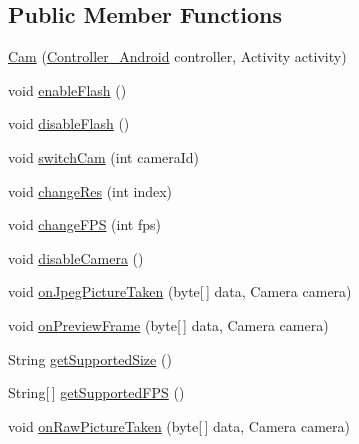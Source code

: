 \subsection*{Public Member Functions}
\begin{DoxyCompactItemize}
\item 
\hyperlink{classswp_1_1tuilmenau_1_1carduinodroid_1_1controller_1_1_cam_a8d39103ae69c076073e36459435c3e6b}{Cam} (\hyperlink{classswp_1_1tuilmenau_1_1carduinodroid_1_1controller_1_1_controller___android}{Controller\+\_\+\+Android} controller, Activity activity)
\item 
void \hyperlink{classswp_1_1tuilmenau_1_1carduinodroid_1_1controller_1_1_cam_a52096c4e16807a5338877c2249bfead5}{enable\+Flash} ()
\item 
void \hyperlink{classswp_1_1tuilmenau_1_1carduinodroid_1_1controller_1_1_cam_a043a28dda760fb66a89c670d97e70e60}{disable\+Flash} ()
\item 
void \hyperlink{classswp_1_1tuilmenau_1_1carduinodroid_1_1controller_1_1_cam_a7550a372448fb220d685acee511882f3}{switch\+Cam} (int camera\+Id)
\item 
void \hyperlink{classswp_1_1tuilmenau_1_1carduinodroid_1_1controller_1_1_cam_a14be40feed14460ce45a254bb9d5573d}{change\+Res} (int index)
\item 
void \hyperlink{classswp_1_1tuilmenau_1_1carduinodroid_1_1controller_1_1_cam_a935021c173d3d0a4e9d9cf1f0fc9253a}{change\+F\+P\+S} (int fps)
\item 
void \hyperlink{classswp_1_1tuilmenau_1_1carduinodroid_1_1controller_1_1_cam_a31a9a63c265425f1917dea93e722e49f}{disable\+Camera} ()
\item 
void \hyperlink{classswp_1_1tuilmenau_1_1carduinodroid_1_1controller_1_1_cam_a9d02cf28701a301ae81da9d826b6c6d6}{on\+Jpeg\+Picture\+Taken} (byte\mbox{[}$\,$\mbox{]} data, Camera camera)
\item 
void \hyperlink{classswp_1_1tuilmenau_1_1carduinodroid_1_1controller_1_1_cam_a36c84a09cf6164b9e80426a61a5ec860}{on\+Preview\+Frame} (byte\mbox{[}$\,$\mbox{]} data, Camera camera)
\item 
String \hyperlink{classswp_1_1tuilmenau_1_1carduinodroid_1_1controller_1_1_cam_aaea0b22ca98286ebc752799baf919457}{get\+Supported\+Size} ()
\item 
String\mbox{[}$\,$\mbox{]} \hyperlink{classswp_1_1tuilmenau_1_1carduinodroid_1_1controller_1_1_cam_ab293c9b431dc51ea0e16584720375473}{get\+Supported\+F\+P\+S} ()
\item 
void \hyperlink{classswp_1_1tuilmenau_1_1carduinodroid_1_1controller_1_1_cam_a356797b49cf972aa95148c88702cf81a}{on\+Raw\+Picture\+Taken} (byte\mbox{[}$\,$\mbox{]} data, Camera camera)

\end{DoxyCompactItemize}
